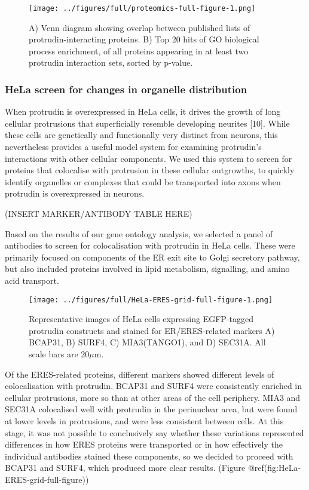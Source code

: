\documentclass[
  12pt,
  a4paper,
]{article}
\begin{document}
\begin{figure}
\centering
\texttt{[image: ../figures/full/proteomics-full-figure-1.png]}
\caption{A) Venn diagram showing overlap between published lists of
protrudin-interacting proteins. B) Top 20 hits of GO biological process
enrichment, of all proteins appearing in at least two protrudin
interaction sets, sorted by p-value.}
\end{figure}

\hypertarget{hela-screen-for-changes-in-organelle-distribution}{%
\subsubsection{HeLa screen for changes in organelle
distribution}\label{hela-screen-for-changes-in-organelle-distribution}}

When protrudin is overexpressed in HeLa cells, it drives the growth of
long cellular protrusions that superficially resemble developing
neurites {[}10{]}. While these cells are genetically and functionally
very distinct from neurons, this nevertheless provides a useful model
system for examining protrudin's interactions with other cellular
components. We used this system to screen for proteins that colocalise
with protrusion in these cellular outgrowths, to quickly identify
organelles or complexes that could be transported into axons when
protrudin is overexpressed in neurons.

(INSERT MARKER/ANTIBODY TABLE HERE)

Based on the results of our gene ontology analysis, we selected a panel
of antibodies to screen for colocalisation with protrudin in HeLa cells.
These were primarily focused on components of the ER exit site to Golgi
secretory pathway, but also included proteins involved in lipid
metabolism, signalling, and amino acid transport.

\begin{figure}
\centering
\texttt{[image: ../figures/full/HeLa-ERES-grid-full-figure-1.png]}
\caption{Representative images of HeLa cells expressing EGFP-tagged
protrudin constructs and stained for ER/ERES-related markers A) BCAP31,
B) SURF4, C) MIA3(TANGO1), and D) SEC31A. All scale bars are
20\(\mu\)m.}
\end{figure}

Of the ERES-related proteins, different markers showed different levels
of colocalisation with protrudin. BCAP31 and SURF4 were consistently
enriched in cellular protrusions, more so than at other areas of the
cell periphery. MIA3 and SEC31A colocalised well with protrudin in the
perinuclear area, but were found at lower levels in protrusions, and
were less consistent between cells. At this stage, it was not possible
to conclusively say whether these variations represented differences in
how ERES proteins were transported or in how effectively the individual
antibodies stained these components, so we decided to proceed with
BCAP31 and SURF4, which produced more clear results. (Figure
@ref(fig:HeLa-ERES-grid-full-figure))
\end{document}
